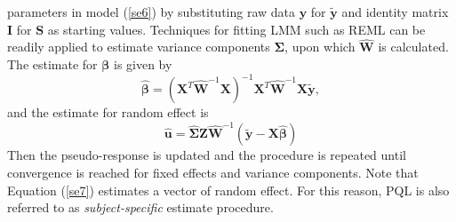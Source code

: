 parameters in model (\ref{se6}) by substituting raw data $\bm y$ for $\tilde{\bm y}$  and identity
matrix $\bm I$ for $\bm S$ as starting values. Techniques for fitting LMM such as REML can be
readily applied to estimate variance components $\bm \Sigma$, upon which $\hat{\bm W}$ is
calculated. The estimate for $\bm \beta$ is given by
\begin{equation}
	\hat{\bm\beta} = (\bm X^T\hat{\bm W}^{-1} \bm X)^{-1}\bm X^T\hat{\bm W}^{-1}\bm X \tilde{\bm y},
\end{equation}
and the estimate for random effect is 
\begin{equation}\label{se7}
	\hat{\bm u} = \hat{\bm\Sigma } \bm Z \hat{\bm W}^{-1} (\tilde{\bm y}-\bm {X} \hat{\bm \beta})
\end{equation}
Then the pseudo-response is updated and the procedure is repeated until convergence is reached for
fixed effects and variance components.  Note that Equation (\ref{se7}) estimates a vector of random
effect. For this reason, PQL is also referred to as \textit{subject-specific} estimate procedure. 

